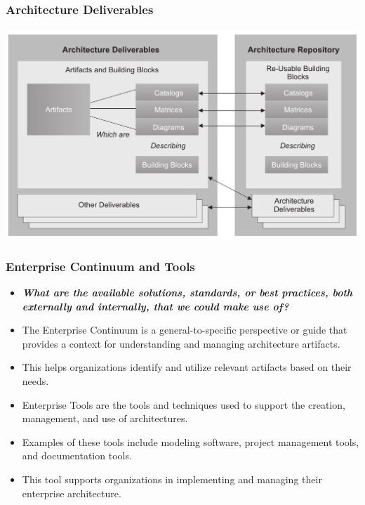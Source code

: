 \documentclass[aspectratio=169, table]{beamer}
\begin{document}
	{
		\begin{frame}
			\frametitle{Architecture Deliverables}
			\framesubtitle{\hspace{1cm}}
			\begin{center}
				\includegraphics[width=.95\textwidth]{../figures/architecture_deliverables}
			\end{center}
		\end{frame}
	}
	
	
	
	\begin{frame}
		\frametitle{Enterprise Continuum and Tools}
		\vspace{20pt}
		\begin{itemize}
			\item \textbf{\textit{What are the available solutions, standards, or best practices, both externally and internally, that we could make use of?}}
			\item The Enterprise Continuum is a general-to-specific perspective or guide that provides a context for understanding and managing architecture artifacts.
			\item This helps organizations identify and utilize relevant artifacts based on their needs.
			\item Enterprise Tools are the tools and techniques used to support the creation, management, and use of architectures.
			\item Examples of these tools include modeling software, project management tools, and documentation tools.
			\item This tool supports organizations in implementing and managing their enterprise architecture.
		\end{itemize}
	\end{frame}
	
\end{document}
